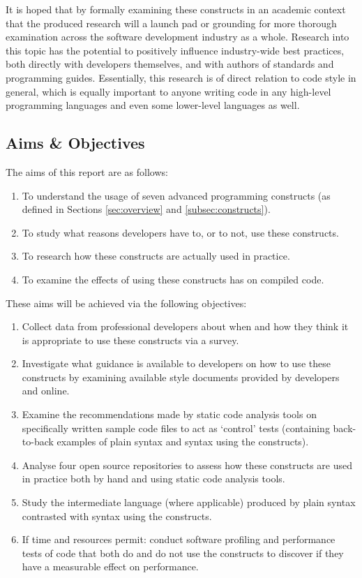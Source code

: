 \documentclass{article}
\begin{document}
        It is hoped that by formally examining these constructs in an academic context that the produced research will a launch pad or grounding for more thorough examination across the software development industry as a whole. Research into this topic has the potential to positively influence industry-wide best practices, both directly with developers themselves, and with authors of standards and programming guides. Essentially, this research is of direct relation to code style in general, which is equally important to anyone writing code in any high-level programming languages and even some lower-level languages as well.
    \subsection{Aims \& Objectives}
        The aims of this report are as follows:
        \begin{enumerate}
            \item To understand the usage of seven advanced programming constructs (as defined in Sections \ref{sec:overview} and \ref{subsec:constructs}).
            \item To study what reasons developers have to, or to not, use these constructs.
            \item To research how these constructs are actually used in practice.
            \item To examine the effects of using these constructs has on compiled code.
        \end{enumerate}


        These aims will be achieved via the following objectives:
        \begin{enumerate}
            \item Collect data from professional developers about when and how they think it is appropriate to use these constructs via a survey.
            \item Investigate what guidance is available to developers on how to use these constructs by examining available style documents provided by developers and online.
            \item Examine the recommendations made by static code analysis tools on specifically written sample code files to act as `control' tests (containing back-to-back examples of plain syntax and syntax using the constructs).
            \item Analyse four open source repositories to assess how these constructs are used in practice both by hand and using static code analysis tools.
            \item Study the intermediate language (where applicable) produced by plain syntax contrasted with syntax using the constructs.
            \item If time and resources permit: conduct software profiling and performance tests of code that both do and do not use the constructs to discover if they have a measurable effect on performance.
        \end{enumerate}
\end{document}
